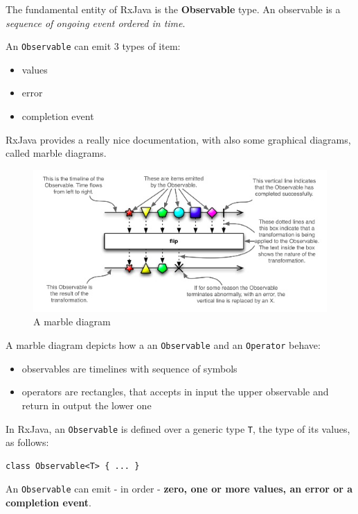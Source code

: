 The fundamental entity of RxJava is the \textbf{Observable} type. An
observable is a \emph{sequence of ongoing event ordered in time}.

An \texttt{Observable} can emit 3 types of item:

\begin{itemize}
\itemsep1pt\parskip0pt
\item
  values
\item
  error
\item
  completion event
\end{itemize}

RxJava provides a really nice documentation, with also some graphical
diagrams, called marble diagrams.

\begin{figure}[htbp]
\centering
\includegraphics[scale=0.75]{imgs/marble.png}
\caption{A marble diagram}
\end{figure}

A marble diagram depicts how a an \texttt{Observable} and an
\texttt{Operator} behave:

\begin{itemize}
\itemsep1pt\parskip0pt
\item
  observables are timelines with sequence of symbols
\item
  operators are rectangles, that accepts in input the upper observable
  and return in output the lower one
\end{itemize}

In RxJava, an \texttt{Observable} is defined over a generic type
\texttt{T}, the type of its values, as follows:

\begin{verbatim}
class Observable<T> { ... }
\end{verbatim}

An \texttt{Observable} can emit - in order - \textbf{zero, one or more
values, an error or a completion event}.

